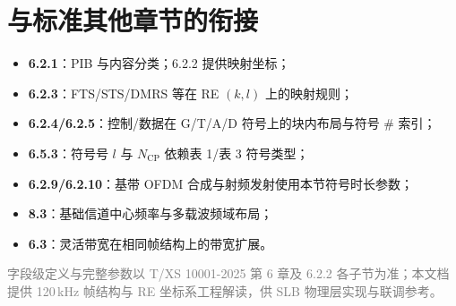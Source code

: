 \documentclass[11pt,a4paper]{ctexart}
\begin{document}
\section{与标准其他章节的衔接}

\begin{itemize}[nosep]
  \item \textbf{6.2.1}：PIB 与内容分类；6.2.2 提供映射坐标；
  \item \textbf{6.2.3}：FTS/STS/DMRS 等在 RE $(k,l)$ 上的映射规则；
  \item \textbf{6.2.4/6.2.5}：控制/数据在 G/T/A/D 符号上的块内布局与符号 \# 索引；
  \item \textbf{6.5.3}：符号号 $l$ 与 $N_{\mathrm{CP}}$ 依赖表 1/表 3 符号类型；
  \item \textbf{6.2.9/6.2.10}：基带 OFDM 合成与射频发射使用本节符号时长参数；
  \item \textbf{8.3}：基础信道中心频率与多载波频域布局；
  \item \textbf{6.3}：灵活带宽在相同帧结构上的带宽扩展。
\end{itemize}

\vfill
\begin{center}
\small\textcolor{gray}{字段级定义与完整参数以 T/XS 10001-2025 第 6 章及 6.2.2 各子节为准；本文档提供 120\,kHz 帧结构与 RE 坐标系工程解读，供 SLB 物理层实现与联调参考。}
\end{center}
\end{document}
